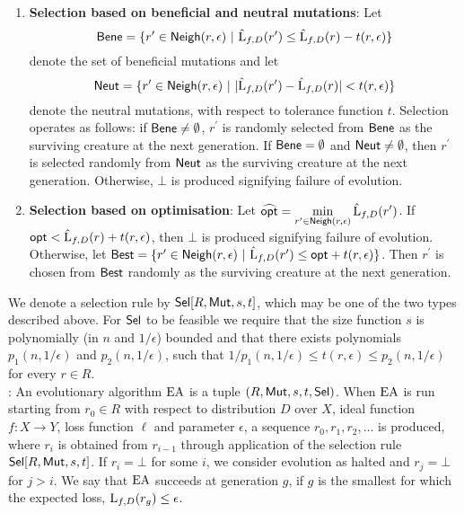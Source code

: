\begin{enumerate}
\item {\bf Selection based on beneficial and neutral mutations}: Let 
%
\[ \mathsf{Bene} = \{r^\prime \in \mathsf{Neigh}(r, \epsilon) ~|~ \hat{\mathrm{L}}_{f, D}(r^\prime) \leq
\hat{\mathrm{L}}_{f, D}(r) - t(r, \epsilon) \} \]  
%
denote the set of beneficial mutations and let 
%
\[ \mathsf{Neut} = \{r^\prime \in \mathsf{Neigh}(r, \epsilon) ~|~ |\hat{\mathrm{L}}_{f, D}(r^\prime) -
\hat{\mathrm{L}}_{f, D}(r)| <  t(r, \epsilon) \} \]
%
denote the neutral mutations, with respect to tolerance function $t$. Selection
operates as follows: if $\mathsf{Bene} \neq \emptyset$, $r^\prime$ is randomly selected
from $\mathsf{Bene}$ as the surviving creature at the next generation.  If $\mathsf{Bene} =
\emptyset$ and $\mathsf{Neut} \neq\emptyset$, then $r^\prime$ is selected randomly from
$\mathsf{Neut}$ as the surviving creature at the next generation.  Otherwise, $\bot$ is
produced signifying failure of evolution.
%
\item {\bf Selection based on optimisation}: Let $\widehat{\mathsf{opt}} =
\displaystyle\min_{r^\prime \in \mathsf{Neigh}(r, \epsilon)} \hat{\mathrm{L}}_{f, D}(r^\prime)$.
If $\mathsf{opt} < \hat{\mathrm{L}}_{f, D}(r) + t(r, \epsilon)$, then $\bot$ is produced
signifying failure of evolution.  Otherwise, let $\mathsf{Best} = \{ r^\prime \in
\mathsf{Neigh}(r, \epsilon) ~|~ \hat{\mathrm{L}}_{f, D}(r^\prime) \leq \mathsf{opt} + t(r, \epsilon) \}$.
Then $r^\prime$ is chosen from $\mathsf{Best}$ randomly as the surviving creature at the
next generation.
\end{enumerate}

We denote a selection rule by $\mathsf{Sel}[R, \mathsf{Mut}, s, t]$, which may be one of the two
types described above. For $\mathsf{Sel}$ to be feasible we require that the size
function $s$ is polynomially (in $n$ and $1/\epsilon$) bounded and that there
exists polynomials $p_1(n, 1/\epsilon)$ and $p_2(n, 1/\epsilon)$, such that
$1/p_1(n, 1/\epsilon) \leq t(r, \epsilon) \leq p_2(n, 1/\epsilon)$ for every $r
\in R$. \medskip \\
%
: An evolutionary algorithm $\mathrm{EA}$ is a
tuple $(R, \mathsf{Mut}, s, t, \mathsf{Sel})$. When $\mathrm{EA}$ is run starting from $r_0 \in R$
with respect to distribution $D$ over $X$, ideal function $f : X \rightarrow Y$,
loss function $\ell$ and parameter $\epsilon$, a sequence $r_0, r_1, r_2,
\ldots$ is produced, where $r_i$ is obtained from $r_{i-1}$ through application
of the selection rule $\mathsf{Sel}[R, \mathsf{Mut}, s, t]$. If $r_i = \bot$ for some $i$, we
consider evolution as halted and $r_j = \bot$ for $j > i$. We say that $\mathrm{EA}$
succeeds at generation $g$, if $g$ is the smallest for which the expected loss,
$\mathrm{L}_{f, D}(r_g) \leq \epsilon$.

